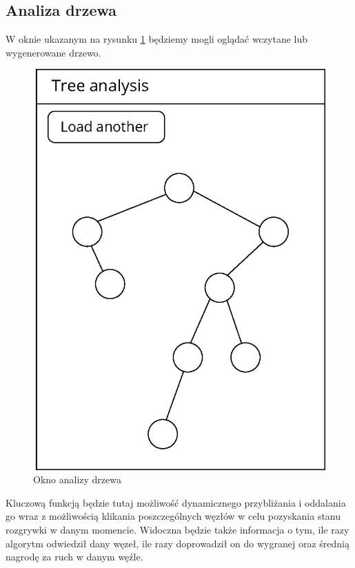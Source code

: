 \documentclass{article}
\begin{document}
	\clearpage
	\subsection{Analiza drzewa}
	W oknie ukazanym na rysunku \ref{rys:analyze_tree} będziemy mogli oglądać wczytane lub wygenerowane drzewo. 
	\begin{figure}[h!]
		\centering
		\includegraphics[scale=0.8]{analyze-eps}
		\caption{Okno analizy drzewa}
		\label{rys:analyze_tree}
	\end{figure}
	
	\noindent Kluczową funkcją będzie tutaj możliwość dynamicznego przybliżania i oddalania go wraz z możliwością klikania poszczególnych węzłów w celu pozyskania stanu rozgrywki w danym momencie. Widoczna będzie także informacja o tym, ile razy algorytm odwiedził dany węzeł, ile razy doprowadził on do wygranej oraz średnią nagrodę za ruch w danym węźle.
	
\end{document}
